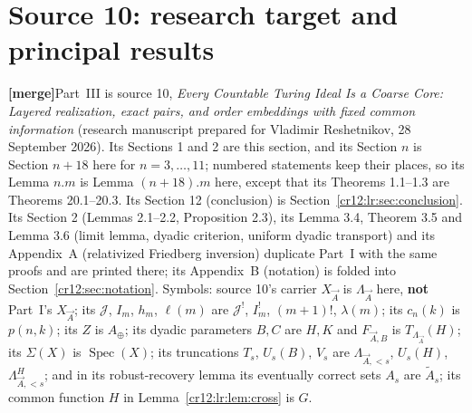 \documentclass[11pt,letterpaper]{article}
\theoremstyle{plain}
\theoremstyle{definition}
\theoremstyle{remark}
\numberwithin{equation}{section}
\newcommand{\Spec}{\operatorname{Spec}}
\newcommand{\mergenote}[1]{\par\smallskip\noindent
 {\small\textsf{\textbf{[merge]}}\enspace #1}\par\smallskip}
\newcommand{\Aplus}{A_{\oplus}}          %
\newcommand{\Jfac}{\mathcal J^{!}}       %
\newcommand{\Lam}{\Lambda_{\vec A}}      %
\begin{document}
\section{Source 10: research target and principal results}\label{cr12:lr:sec:intro}
\mergenote{Part~III is source 10, \emph{Every Countable Turing Ideal Is a Coarse Core:
Layered realization, exact pairs, and order embeddings with fixed common information}
(research manuscript prepared for Vladimir Reshetnikov, 28 September 2026). Its
Sections 1 and 2 are this section, and its Section $n$ is Section $n+18$ here for
$n=3,\dots,11$; numbered statements keep their places, so its Lemma $n.m$ is Lemma
$(n+18).m$ here, except that its Theorems 1.1--1.3 are Theorems 20.1--20.3. Its
Section 12 (conclusion) is Section~\ref{cr12:lr:sec:conclusion}. Its Section 2 (Lemmas
2.1--2.2, Proposition 2.3), its Lemma 3.4, Theorem 3.5 and Lemma 3.6 (limit lemma,
dyadic criterion, uniform dyadic transport) and its Appendix~A (relativized Friedberg
inversion) duplicate Part~I with the same proofs and are printed there; its
Appendix~B (notation) is folded into Section~\ref{cr12:sec:notation}. Symbols: source
10's carrier $X_{\vec A}$ is $\Lam$ here, \textbf{not} Part~I's $X_{\vec A}$; its
$\mathcal J$, $I_m$, $h_m$, $\ell(m)$ are $\Jfac$, $I^!_m$, $(m+1)!$, $\lambda(m)$; its
$c_n(k)$ is $p(n,k)$; its $Z$ is $\Aplus$; its dyadic parameters $B,C$ are $H,K$ and
$F_{\vec A,B}$ is $T_{\Lam}(H)$; its $\Sigma(X)$ is $\Spec(X)$; its truncations $T_s$,
$U_s(B)$, $V_s$ are $\Lambda_{\vec A,<s}$, $U_s(H)$, $\Lambda^H_{\vec A,<s}$; and in its robust-recovery
lemma its eventually correct sets $A_s$ are $\tilde A_s$; its common function $H$ in
Lemma~\ref{cr12:lr:lem:cross} is $G$.}
\end{document}
